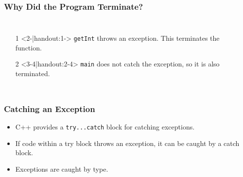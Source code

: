 \documentclass{beamer}
\begin{document}
\begin{frame}[b]
    \frametitle{Why Did the Program Terminate?}
    \begin{columns}
        \begin{enumerate}
            \item[1]<2-|handout:1-> {\tt getInt} throws an exception.  This terminates the function.
            \par\vspace{0.3in}
            \item[2]<3-4|handout:2-4> {\tt main} does not catch the exception, so it is also terminated.
            \par\vspace{0.25in}
        \end{enumerate}
            \begin{overlayarea}{\textwidth}{0.9\textheight} 
            \end{overlayarea}
    \end{columns}
\end{frame}

\begin{frame}
    \frametitle{Catching an Exception}
    \begin{itemize}[<+->]
        \item C++ provides a {\tt try...catch} block for catching exceptions.
        \item If code within a try block throws an exception, it can be caught by a catch block.
        \item Exceptions are caught by type.
    \end{itemize}
\end{frame}
\end{document}
